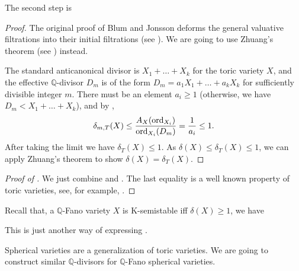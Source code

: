The second step is
\begin{proof}
	The original proof of Blum and Jonsson deforms the general valuative filtrations into their initial filtrations (see \cite[\S7.4]{BJ_thre_val_kst}). We are going to use Zhuang's theorem (see ) instead.

	The standard anticanonical divisor is $X_1 + \dots + X_k$ for the toric variety $X$, and the effective $\mathbb{Q}$-divisor $D_m$ is of the form $D_m = a_1 X_1 + \dots + a_k X_k$ for sufficiently divisible integer $m$. There must be an element $a_i \geq 1$ (otherwise, we have $D_m < X_1 + \dots + X_k$), and by ,
	\begin{equation*}
		\delta_{m, T}(X) \leq {A_X(\ord_{X_i}) \over \ord_{X_i}(D_m)} = {1 \over a_i} \leq 1.
	\end{equation*}
	After taking the limit we have $\delta_T(X) \leq 1$. As $\delta(X) \leq \delta_T(X) \leq 1$, we can apply Zhuang's theorem to show $\delta(X) = \delta_T(X)$.
\end{proof}

\begin{proof}[Proof of ]
	We just combine  and . The last equality is a well known property of toric varieties, see, for example, \cite[Proposition 7.2]{BJ_thre_val_kst}.
\end{proof}

Recall that, a $\mathbb{Q}$-Fano variety $X$ is K-semistable iff $\delta(X) \geq 1$, we have
\begin{remark*}
	This is just another way of expressing \cite[Corollary 7.17]{BJ_thre_val_kst}.
\end{remark*}

Spherical varieties are a generalization of toric varieties. We are going to construct similar $\mathbb{Q}$-divisors for $\mathbb{Q}$-Fano spherical varieties.
